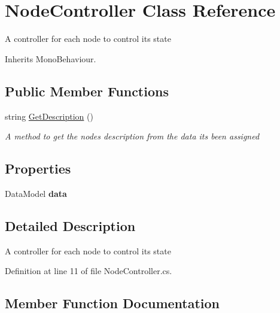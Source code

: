 \hypertarget{class_node_controller}{}\section{Node\+Controller Class Reference}
\label{class_node_controller}


A controller for each node to control its state  




Inherits Mono\+Behaviour.

\subsection*{Public Member Functions}
\begin{DoxyCompactItemize}
\item 
string \hyperlink{class_node_controller_a0b70efdd9968c3fa6830aa00f54f8b39}{Get\+Description} ()
\begin{DoxyCompactList}\small\item\em A method to get the node\textquotesingle{}s description from the data its been assigned \end{DoxyCompactList}\end{DoxyCompactItemize}
\subsection*{Properties}
\begin{DoxyCompactItemize}
\item 
\mbox{\label{class_node_controller_a3b9445aab804820bf1523757be1e8e25}} 
Data\+Model {\bfseries data}
\end{DoxyCompactItemize}


\subsection{Detailed Description}
A controller for each node to control its state 



Definition at line 11 of file Node\+Controller.\+cs.



\subsection{Member Function Documentation}
\mbox{\label{class_node_controller_a0b70efdd9968c3fa6830aa00f54f8b39}} 
